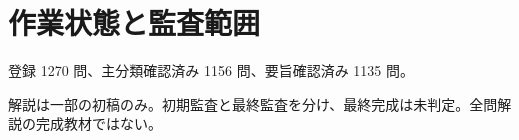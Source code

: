 \chapter{作業状態と監査範囲}
登録 1270 問、主分類確認済み 1156 問、要旨確認済み 1135 問。
\par 解説は一部の初稿のみ。初期監査と最終監査を分け、最終完成は未判定。全問解説の完成教材ではない。
